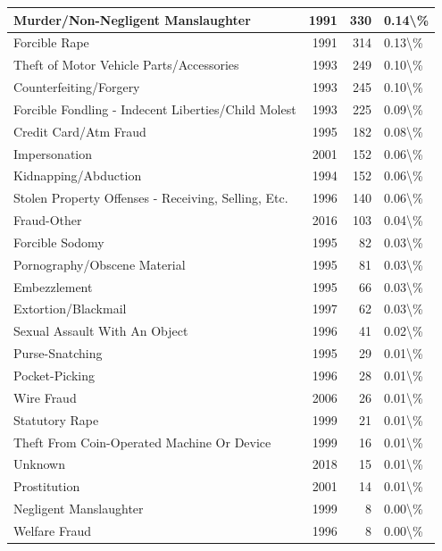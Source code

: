 \documentclass[
]{krantz}
\begin{document}
\begin{longtable}[t]{l|r|r|l}
\hline
Murder/Non-Negligent Manslaughter & 1991 & 330 & 0.14\textbackslash{}\%\\
\hline
Forcible Rape & 1991 & 314 & 0.13\textbackslash{}\%\\
\hline
Theft of Motor Vehicle Parts/Accessories & 1993 & 249 & 0.10\textbackslash{}\%\\
\hline
Counterfeiting/Forgery & 1993 & 245 & 0.10\textbackslash{}\%\\
\hline
Forcible Fondling - Indecent Liberties/Child Molest & 1993 & 225 & 0.09\textbackslash{}\%\\
\hline
Credit Card/Atm Fraud & 1995 & 182 & 0.08\textbackslash{}\%\\
\hline
Impersonation & 2001 & 152 & 0.06\textbackslash{}\%\\
\hline
Kidnapping/Abduction & 1994 & 152 & 0.06\textbackslash{}\%\\
\hline
Stolen Property Offenses - Receiving, Selling, Etc. & 1996 & 140 & 0.06\textbackslash{}\%\\
\hline
Fraud-Other & 2016 & 103 & 0.04\textbackslash{}\%\\
\hline
Forcible Sodomy & 1995 & 82 & 0.03\textbackslash{}\%\\
\hline
Pornography/Obscene Material & 1995 & 81 & 0.03\textbackslash{}\%\\
\hline
Embezzlement & 1995 & 66 & 0.03\textbackslash{}\%\\
\hline
Extortion/Blackmail & 1997 & 62 & 0.03\textbackslash{}\%\\
\hline
Sexual Assault With An Object & 1996 & 41 & 0.02\textbackslash{}\%\\
\hline
Purse-Snatching & 1995 & 29 & 0.01\textbackslash{}\%\\
\hline
Pocket-Picking & 1996 & 28 & 0.01\textbackslash{}\%\\
\hline
Wire Fraud & 2006 & 26 & 0.01\textbackslash{}\%\\
\hline
Statutory Rape & 1999 & 21 & 0.01\textbackslash{}\%\\
\hline
Theft From Coin-Operated Machine Or Device & 1999 & 16 & 0.01\textbackslash{}\%\\
\hline
Unknown & 2018 & 15 & 0.01\textbackslash{}\%\\
\hline
Prostitution & 2001 & 14 & 0.01\textbackslash{}\%\\
\hline
Negligent Manslaughter & 1999 & 8 & 0.00\textbackslash{}\%\\
\hline
Welfare Fraud & 1996 & 8 & 0.00\textbackslash{}\%\\

\end{longtable}
\end{document}
